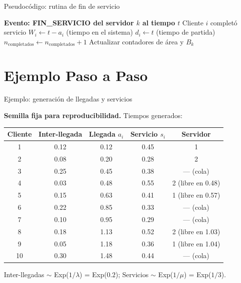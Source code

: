 \documentclass[aspectratio=1610, 9pt]{beamer}
\begin{document}
\begin{frame}{Pseudocódigo: rutina de fin de servicio}

\begin{algorithm}[H]
\SetAlgoLined
\small
\textbf{Evento: FIN\_SERVICIO del servidor $k$ al tiempo $t$}\;
Cliente $i$ completó servicio\;
$W_i \leftarrow t - a_i$ \quad (tiempo en el sistema)\;
$d_i \leftarrow t$ \quad (tiempo de partida)\;
$n_{\text{completados}} \leftarrow n_{\text{completados}} + 1$\;
Actualizar contadores de área y $B_k$\;
\end{algorithm}
\end{frame}

\section{Ejemplo Paso a Paso}

\begin{frame}{Ejemplo: generación de llegadas y servicios}

\textbf{Semilla fija para reproducibilidad.} Tiempos generados:

\vspace{0.2cm}
\begin{center}
\renewcommand{\arraystretch}{1.2}
\small
\begin{tabular}{ccccc}
\toprule
\textbf{Cliente} & \textbf{Inter-llegada} & \textbf{Llegada $a_i$} & \textbf{Servicio $s_i$} & \textbf{Servidor} \\
\midrule
1 & 0.12 & 0.12 & 0.45 & 1 \\
2 & 0.08 & 0.20 & 0.28 & 2 \\
3 & 0.25 & 0.45 & 0.38 & --- (cola) \\
4 & 0.03 & 0.48 & 0.55 & 2 (libre en 0.48) \\
5 & 0.15 & 0.63 & 0.41 & 1 (libre en 0.57) \\
6 & 0.22 & 0.85 & 0.33 & --- (cola) \\
7 & 0.10 & 0.95 & 0.29 & --- (cola) \\
8 & 0.18 & 1.13 & 0.52 & 2 (libre en 1.03) \\
9 & 0.05 & 1.18 & 0.36 & 1 (libre en 1.04) \\
10 & 0.30 & 1.48 & 0.44 & --- (cola) \\
\bottomrule
\end{tabular}
\end{center}

\vspace{0.2cm}
\small Inter-llegadas $\sim$ Exp($1/\lambda$) = Exp($0.2$); Servicios $\sim$ Exp($1/\mu$) = Exp($1/3$).
\end{frame}
\end{document}
